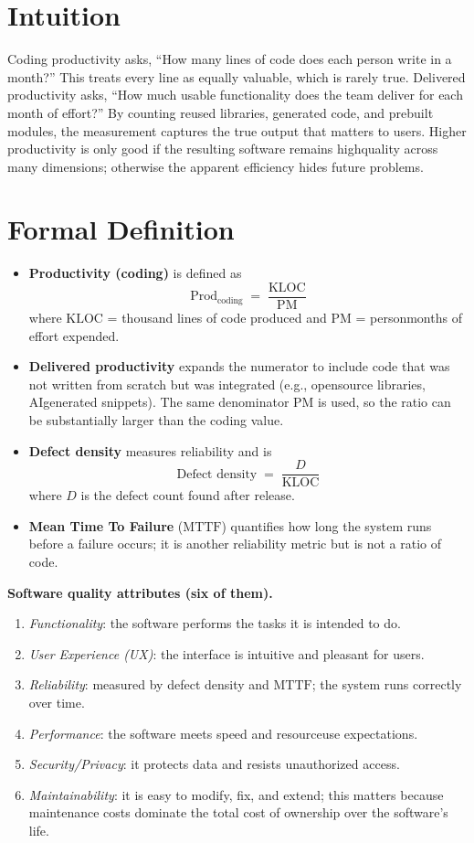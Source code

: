 \documentclass[12pt, a4paper]{article}
\begin{document}
\section{Intuition}
Coding productivity asks, ``How many lines of code does each person write in a month?''  This treats every line as equally valuable, which is rarely true.  
Delivered productivity asks, ``How much usable functionality does the team deliver for each month of effort?''  By counting reused libraries, generated code, and prebuilt modules, the measurement captures the true output that matters to users.  
Higher productivity is only good if the resulting software remains highquality across many dimensions; otherwise the apparent efficiency hides future problems.  

\section{Formal Definition}
\begin{itemize}
  \item \textbf{Productivity (coding)} is defined as 
  \[
    \text{Prod}_{\text{coding}} \;=\; \frac{\text{KLOC}}{\text{PM}}
  \]
  where \(\text{KLOC}\) = thousand lines of code produced and \(\text{PM}\) = personmonths of effort expended.
  \item \textbf{Delivered productivity} expands the numerator to include code that was not written from scratch but was integrated (e.g., opensource libraries, AIgenerated snippets).  The same denominator \(\text{PM}\) is used, so the ratio can be substantially larger than the coding value.
  \item \textbf{Defect density} measures reliability and is 
  \[
    \text{Defect density} \;=\; \frac{D}{\text{KLOC}}
  \]
  where \(D\) is the defect count found after release.
  \item \textbf{Mean Time To Failure} (\(\text{MTTF}\)) quantifies how long the system runs before a failure occurs; it is another reliability metric but is not a ratio of code.
\end{itemize}

\medskip
\noindent\textbf{Software quality attributes (six of them).}
\begin{enumerate}
  \item \emph{Functionality}: the software performs the tasks it is intended to do.
  \item \emph{User Experience (UX)}: the interface is intuitive and pleasant for users.
  \item \emph{Reliability}: measured by defect density and \(\text{MTTF}\); the system runs correctly over time.
  \item \emph{Performance}: the software meets speed and resourceuse expectations.
  \item \emph{Security/Privacy}: it protects data and resists unauthorized access.
  \item \emph{Maintainability}: it is easy to modify, fix, and extend; this matters because maintenance costs dominate the total cost of ownership over the software's life.
\end{enumerate}
\end{document}
